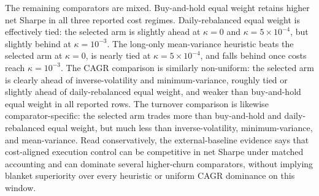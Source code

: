 \documentclass[10pt,twocolumn]{article}
\begin{document}
The remaining comparators are mixed. Buy-and-hold equal weight retains higher net Sharpe in all three reported cost regimes. Daily-rebalanced equal weight is effectively tied: the selected arm is slightly ahead at $\kappa=0$ and $\kappa=5\times10^{-4}$, but slightly behind at $\kappa=10^{-3}$. The long-only mean-variance heuristic beats the selected arm at $\kappa=0$, is nearly tied at $\kappa=5\times10^{-4}$, and falls behind once costs reach $\kappa=10^{-3}$. The CAGR comparison is similarly non-uniform: the selected arm is clearly ahead of inverse-volatility and minimum-variance, roughly tied or slightly ahead of daily-rebalanced equal weight, and weaker than buy-and-hold equal weight in all reported rows. The turnover comparison is likewise comparator-specific: the selected arm trades more than buy-and-hold and daily-rebalanced equal weight, but much less than inverse-volatility, minimum-variance, and mean-variance. Read conservatively, the external-baseline evidence says that cost-aligned execution control can be competitive in net Sharpe under matched accounting and can dominate several higher-churn comparators, without implying blanket superiority over every heuristic or uniform CAGR dominance on this window.
\end{document}
